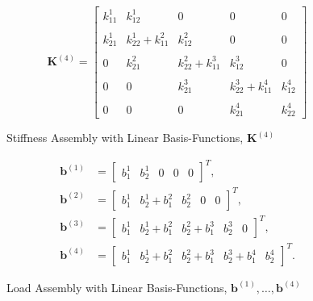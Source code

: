 %
\begin{figure}[H]
	\centering
	\begin{equation*}
		\mathbf{K}^{\left( 4 \right)} =
		\begin{bmatrix}
			k_{11}^{1} & k_{12}^{1} & 0 & 0 & 0 \\ \\
			k_{21}^{1} & k_{22}^{1} + k_{11}^{2} & k_{12}^{2} & 0 & 0 \\ \\
			0 & k_{21}^{2} & k_{22}^{2} + k_{11}^{3} & k_{12}^{3} & 0 \\ \\
			0 & 0 & k_{21}^{3} & k_{22}^{3} + k_{11}^{4} & k_{12}^{4} \\ \\
			0 & 0 & 0 & k_{21}^{4} & k_{22}^{4}
		\end{bmatrix}
	\end{equation*}
	\caption{Stiffness Assembly with Linear Basis-Functions, $\mathbf{K}^{\left(4\right)}$ }
	\label{fig:K_4_Linear}
\end{figure}
%
\begin{figure}[H]
	\centering
	\begin{align*}
	\mathbf{b}^{\left( 1 \right)} &=
	\begin{bmatrix}
	b_{1}^{1} & b_{2}^{1} & 0 & 0 & 0
	\end{bmatrix}^{T},	\\
	\mathbf{b}^{\left( 2 \right)} &=
	\begin{bmatrix}
	b_{1}^{1} & b_{2}^{1} + b_{1}^{2} & b_{2}^{2} & 0 & 0
	\end{bmatrix}^{T},	\\
	\mathbf{b}^{\left( 3 \right)} &=
	\begin{bmatrix}
	b_{1}^{1} & b_{2}^{1} + b_{1}^{2} & b_{2}^{2} + b_{1}^{3} & b_{2}^{3} & 0
	\end{bmatrix}^{T},	\\
	\mathbf{b}^{\left( 4 \right)} &=
	\begin{bmatrix}
	b_{1}^{1} & b_{2}^{1} + b_{1}^{2} & b_{2}^{2} + b_{1}^{3} & b_{2}^{3} + b_{1}^{4} & b_{2}^{4}
	\end{bmatrix}^{T}.
	\end{align*}
	\caption{Load Assembly with Linear Basis-Functions, $\mathbf{b}^{\left( 1 \right)}, \dots, \mathbf{b}^{ \left( 4 \right) }$}
	\label{fig:b_1_To_b_4_Linear}
\end{figure}
%
